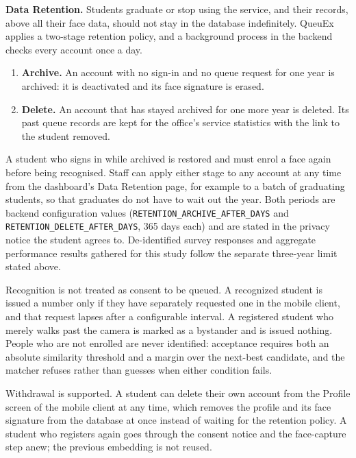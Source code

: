 \documentclass{research}
\newcommand{\sysname}{QueuEx}
\begin{document}
\textbf{Data Retention.}\label{cr:retention} Students graduate or stop using the service, and
their records, above all their face data, should not stay in the database
indefinitely. \sysname{} applies a two-stage retention policy, and a
background process in the backend checks every account once a day.
\begin{enumerate}
  \item \textbf{Archive.} An account with no sign-in and no queue request
        for one year is archived: it is deactivated and its face
        signature is erased.
  \item \textbf{Delete.} An account that has stayed archived for one more
        year is deleted. Its past queue records are kept for the
        office's service statistics with the link to the student
        removed.
\end{enumerate}
A student who signs in while archived is restored and must enrol a face
again before being recognised. Staff can apply either stage to any
account at any time from the dashboard's Data Retention page, for example
to a batch of graduating students, so that graduates do not have to wait
out the year. Both periods are backend configuration values
(\texttt{RETENTION\_ARCHIVE\_AFTER\_DAYS} and
\texttt{RETENTION\_DELETE\_AFTER\_DAYS}, 365 days each) and are stated in
the privacy notice the student agrees to. De-identified survey responses
and aggregate performance results gathered for this study follow the
separate three-year limit stated above.

Recognition is not treated as consent to be queued. A recognized student
is issued a number only if they have separately requested one in the
mobile client, and that request lapses after a configurable interval. A
registered student who merely walks past the camera is marked as a
bystander and is issued nothing. People who are not enrolled are never
identified: acceptance requires both an absolute similarity threshold and
a margin over the next-best candidate, and the matcher refuses rather than
guesses when either condition fails.

Withdrawal is supported. A student can delete their own account from the
Profile screen of the mobile client at any time, which removes the
profile and its face signature from the database at once instead of
waiting for the retention policy. A student who registers again goes
through the consent notice and the face-capture step anew; the previous
embedding is not reused.
\end{document}
